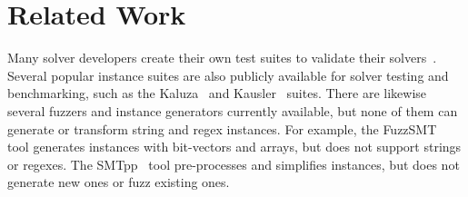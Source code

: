 \section{Related Work}

Many solver developers create their own test suites to
validate their solvers~\cite{cvc4-tests,z3str3-tests,z3str2-tests}. Several
popular instance suites are also publicly available for
solver testing and benchmarking, such as the Kaluza~\cite{kaluza} and
Kausler~\cite{kausler} suites. There are likewise several fuzzers and
instance generators currently available, but none of them can generate
or transform string and regex instances. For example, the
FuzzSMT~\cite{fuzzsmt} tool generates \smt{} instances with bit-vectors
and arrays, but does not support strings or regexes. The
SMTpp~\cite{smtpp} tool pre-processes and simplifies instances, but
does not generate new ones or fuzz existing ones.
